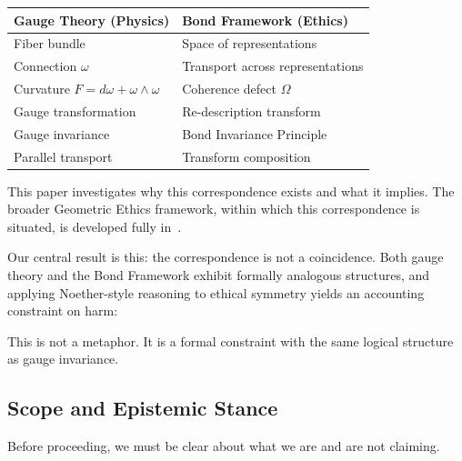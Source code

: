 \documentclass[12pt,letterpaper]{article}
\theoremstyle{definition}
\theoremstyle{remark}
\begin{document}
\begin{center}
\begin{tabular}{ll}
\toprule
\textbf{Gauge Theory (Physics)} & \textbf{Bond Framework (Ethics)} \\
\midrule
Fiber bundle & Space of representations \\
Connection $\omega$ & Transport across representations \\
Curvature $F = d\omega + \omega \wedge \omega$ & Coherence defect $\Omega$ \\
Gauge transformation & Re-description transform \\
Gauge invariance & Bond Invariance Principle \\
Parallel transport & Transform composition \\
\bottomrule
\end{tabular}
\end{center}

This paper investigates why this correspondence exists and what it implies. The broader Geometric Ethics framework, within which this correspondence is situated, is developed fully in~\cite{bond2026ge}.

Our central result is this: the correspondence is not a coincidence. Both gauge theory and the Bond Framework exhibit formally analogous structures, and applying Noether-style reasoning to ethical symmetry yields an accounting constraint on harm:

\begin{center}
\end{center}

This is not a metaphor. It is a formal constraint with the same logical structure as gauge invariance.

\subsection{Scope and Epistemic Stance}

Before proceeding, we must be clear about what we are and are not claiming.
\end{document}
